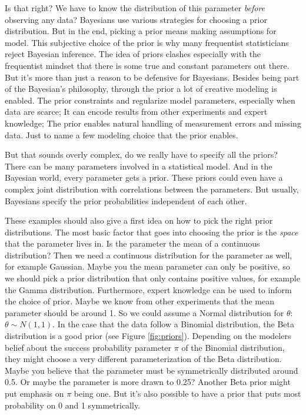 \documentclass[
  10pt,
]{scrbook}
\begin{document}
Is that right?
We have to know the distribution of this parameter \emph{before} observing any data?
Bayesians use various strategies for choosing a prior distribution.
But in the end, picking a prior means making assumptions for model.
This subjective choice of the prior is why many frequentist statisticians reject Bayesian inference.
The idea of priors clashes especially with the frequentist mindset that there is some true and constant parameters out there.
But it's more than just a reason to be defensive for Bayesians.
Besides being part of the Bayesian's philosophy, through the prior a lot of creative modeling is enabled.
The prior constraints and regularize model parameters, especially when data are scarce;
It can encode results from other experiments and expert knowledge;
The prior enables natural handling of measurement errors and missing data.
Just to name a few modeling choice that the prior enables.

But that sounds overly complex, do we really have to specify all the priors?
There can be many parameters involved in a statistical model.
And in the Bayesian world, every parameter gets a prior.
These priors could even have a complex joint distribution with correlations between the parameters.
But usually, Bayesians specify the prior probabilities independent of each other.

These examples should also give a first idea on how to pick the right prior distributions.
The most basic factor that goes into choosing the prior is the \emph{space} that the parameter lives in.
Is the parameter the mean of a continuous distribution? Then we need a continuous distribution for the parameter as well, for example Gaussian.
Maybe you the mean parameter can only be positive, so we should pick a prior distribution that only contains positive values, for example the Gamma distribution.
Furthermore, expert knowledge can be used to inform the choice of prior.
Maybe we know from other experiments that the mean parameter should be around 1.
So we could assume a Normal distribution for \(\theta\): \(\theta \sim N(1, 1)\).
In the case that the data follow a Binomial distribution, the Beta distribution is a good prior (see Figure \ref{fig:priors}).
Depending on the modelers belief about the success probability parameter \(\pi\) of the Binomial distribution, they might choose a very different parameterization of the Beta distribution.
Maybe you believe that the parameter must be symmetrically distributed around 0.5.
Or maybe the parameter is more drawn to 0.25?
Another Beta prior might put emphasis on \(\pi\) being one.
But it's also possible to have a prior that puts most probability on 0 and 1 symmetrically.
\end{document}

